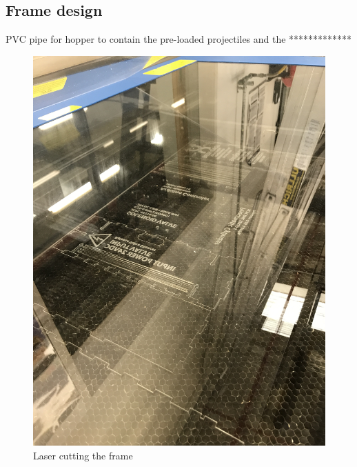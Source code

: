 \documentclass[a4paper, 10pt]{IEEEconf}
\begin{document}

\subsection{Frame design}

PVC pipe for hopper to contain the pre-loaded projectiles and the 
*************

\begin{figure}[H]
  \includegraphics[width=\linewidth]{images/laser}
  \caption{Laser cutting the frame}
  \label{fig:Laser cutting the frame}
\end{figure}
\end{document}
